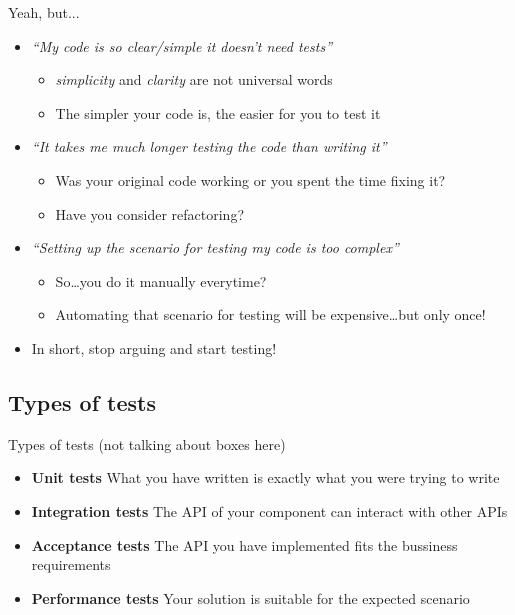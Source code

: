 \documentclass[]{beamer}
\begin{document}
\begin{frame}{Yeah, but...}
    \begin{itemize}
    \item \textit{``My code is so clear/simple it doesn't need tests''}
        \begin{itemize}
        \pause
        \item \emph{simplicity} and \emph{clarity} are not universal words
        \pause
        \item The simpler your code is, the easier for you to test it
        \end{itemize}
    \pause
    \item \textit{``It takes me much longer testing the code than writing it''}
        \begin{itemize}
        \pause
        \item Was your original code working or you spent the time fixing it?
        \pause
        \item Have you consider refactoring?
        \end{itemize}
    \pause
    \item \textit{``Setting up the scenario for testing my code is too complex''}
        \begin{itemize}
        \pause
        \item So\dots you do it manually everytime?
        \pause
        \item Automating that scenario for testing will be expensive\dots but only once!
        \end{itemize}
    \item In short, stop arguing and start testing!
    \end{itemize}
\end{frame}


\subsection*{Types of tests}
\label{types_of_tests}

\begin{frame}{Types of tests (not talking about boxes here)}
    \begin{itemize}
    \item \textbf{Unit tests} What you have written is exactly what you were trying to write
    \pause
    \item \textbf{Integration tests} The API of your component can interact with other APIs
    \pause
    \item \textbf{Acceptance tests} The API you have implemented fits the bussiness requirements
    \pause
    \item \textbf{Performance tests} Your solution is suitable for the expected scenario
    \end{itemize}
\end{frame}
\end{document}
